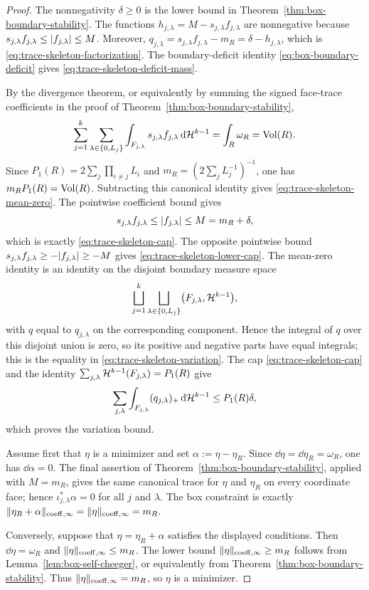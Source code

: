 \begin{proof}
The nonnegativity $\delta\ge0$ is the lower bound in
Theorem~\ref{thm:box-boundary-stability}. The functions
$h_{j,\lambda}=M-s_{j,\lambda}f_{j,\lambda}$ are nonnegative because
$s_{j,\lambda}f_{j,\lambda}\le\lvert f_{j,\lambda} \rvert\le M$. Moreover,
$q_{j,\lambda}=s_{j,\lambda}f_{j,\lambda}-m_R=\delta-h_{j,\lambda}$, which is
\eqref{eq:trace-skeleton-factorization}. The boundary-deficit identity
\eqref{eq:box-boundary-deficit} gives \eqref{eq:trace-skeleton-deficit-mass}.

By the divergence theorem, or equivalently by summing the signed face-trace
coefficients in the proof of Theorem~\ref{thm:box-boundary-stability},
\[
\sum_{j=1}^k\sum_{\lambda\in\{0,L_j\}}
\int_{F_{j,\lambda}}s_{j,\lambda}f_{j,\lambda}\,\mathrm{d}\mathcal{H}^{k-1}
=\int_R\omega_R
=\operatorname{Vol}(R).
\]
Since $P_1(R)=2\sum_j\prod_{i\ne j}L_i$ and
$m_R=(2\sum_jL_j^{-1})^{-1}$, one has $m_RP_1(R)=\operatorname{Vol}(R)$. Subtracting this
canonical identity gives \eqref{eq:trace-skeleton-mean-zero}. The pointwise
coefficient bound gives
\[
s_{j,\lambda}f_{j,\lambda}\le \lvert f_{j,\lambda} \rvert\le M=m_R+\delta,
\]
which is exactly \eqref{eq:trace-skeleton-cap}. The opposite pointwise bound
$s_{j,\lambda}f_{j,\lambda}\ge-\lvert f_{j,\lambda} \rvert\ge-M$ gives
\eqref{eq:trace-skeleton-lower-cap}. The mean-zero identity is an identity on
the disjoint boundary measure space
\[
\bigsqcup_{j=1}^k\bigsqcup_{\lambda\in\{0,L_j\}}
\bigl(F_{j,\lambda},\mathcal{H}^{k-1}\bigr),
\]
with $q$ equal to $q_{j,\lambda}$ on the corresponding component. Hence the
integral of $q$ over this disjoint union is zero, so its positive and negative
parts have equal integrals; this is the equality in
\eqref{eq:trace-skeleton-variation}. The cap
\eqref{eq:trace-skeleton-cap} and the identity
$\sum_{j,\lambda}\mathcal{H}^{k-1}(F_{j,\lambda})=P_1(R)$ give
\[
\sum_{j,\lambda}\int_{F_{j,\lambda}}(q_{j,\lambda})_+\,\mathrm{d}\mathcal{H}^{k-1}
\le P_1(R)\delta,
\]
which proves the variation bound.

Assume first that $\eta$ is a minimizer and set
$\alpha:=\eta-\eta_R$. Since $\dd\eta=\dd\eta_R=\omega_R$, one has
$\dd\alpha=0$. The final assertion of
Theorem~\ref{thm:box-boundary-stability}, applied with $M=m_R$, gives the same
canonical trace for $\eta$ and $\eta_R$ on every coordinate face; hence
$\iota_{j,\lambda}^\ast\alpha=0$ for all $j$ and $\lambda$. The box constraint
is exactly $\lVert \eta_R+\alpha \rVert_{\mathrm{coeff},\infty}=\lVert \eta \rVert_{\mathrm{coeff},\infty}=m_R$.

Conversely, suppose that $\eta=\eta_R+\alpha$ satisfies the displayed
conditions. Then $\dd\eta=\omega_R$ and
$\lVert \eta \rVert_{\mathrm{coeff},\infty}\le m_R$. The lower bound
$\lVert \eta \rVert_{\mathrm{coeff},\infty}\ge m_R$ follows from
Lemma~\ref{lem:box-self-cheeger}, or equivalently from
Theorem~\ref{thm:box-boundary-stability}. Thus
$\lVert \eta \rVert_{\mathrm{coeff},\infty}=m_R$, so $\eta$ is a minimizer.


\end{proof}
